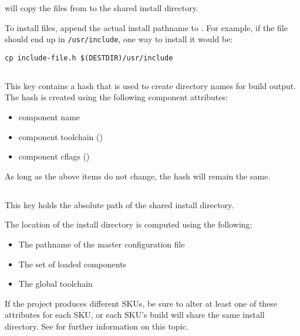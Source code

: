\lmsbw will copy the files from \destdir to the shared install directory.

To install files, append the actual install pathname to \destdir.  For
example, if the file should end up in \texttt{/usr/include}, one way
to install it would be:

\begin{verbatim}
cp include-file.h $(DESTDIR)/usr/include
\end{verbatim}


\subsection{}\label{variables:hash}

This key contains a hash that is used to create directory names for
build output.  The hash is created using the following component
attributes:

\begin{itemize}
\item component name
\item component toolchain ()
\item component cflags ()
\end{itemize}

As long as the above items do not change, the hash will remain the
same.

\subsection{}\label{variables:install-directory}
This key holds the absolute path of the shared install directory.

The location of the install directory is computed using the following:

\begin{itemize}
\item{The pathname of the master configuration file}
\item{The set of loaded components}
\item{The global toolchain}
\end{itemize}

If the project produces different SKUs, be sure to alter at least one
of these attributes for each SKU, or each SKU's build will share the
same install directory.  See  for further
information on this topic.

